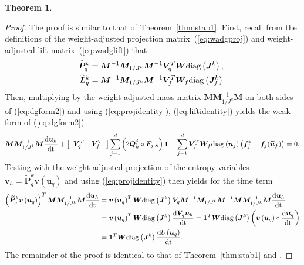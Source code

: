 \documentclass[preprint,10pt]{article}
\theoremstyle{definition}
\theoremstyle{lemma}
\theoremstyle{theorem}
\newtheorem{theorem}{Theorem}
\theoremstyle{assumption}
\renewcommand{\tilde}{\widetilde}
\newcommand{\td}[2]{\frac{{\rm d}#1}{{\rm d}{\rm #2}}}
\newcommand{\LRp}[1]{\left( #1 \right)}
\newcommand{\LRs}[1]{\left[ #1 \right]}
\newcommand{\diag}[1]{{\rm diag}\LRp{#1}}
\begin{document}
{\begin{theorem}
\[\]
\label{thm:stab2}
\end{theorem}
\begin{proof}
The proof is similar to that of Theorem~\ref{thm:stab1}.  
First, recall from the definitions of the weight-adjusted projection matrix~(\ref{eq:wadgproj}) and weight-adjusted lift matrix~(\ref{eq:wadglift}) that
\begin{align}
\tilde{\bm{P}}^k_q &= \bm{M}^{-1}\bm{M}_{1/J^k} \bm{M}^{-1} \bm{V}_q^T \bm{W}  \diag{\bm{J}^k  }\label{eq:projidentity},\\
\tilde{\bm{L}}^k_q &= \bm{M}^{-1}\bm{M}_{1/J^k} \bm{M}^{-1} \bm{V}_f^T \bm{W}_f\diag{\bm{J}^k_f}\label{eq:liftidentity}.
\end{align}
Then, multiplying by the weight-adjusted mass matrix $\bm{M}\bm{M}_{1/J^k}^{-1}\bm{M}$ on both sides of (\ref{eq:dgform2}) and using (\ref{eq:projidentity}), (\ref{eq:liftidentity}) yields the weak form of (\ref{eq:dgform2})
\begin{equation}
\bm{M}\bm{M}_{1/J^k}^{-1}\bm{M}\td{\bm{u}_h}{t} + \LRs{\begin{array}{cc}{\bm{V}}_q^T & {\bm{V}}_f^T\end{array}}
\sum_{j=1}^d \LRp{2\bm{Q}^j_k \circ \bm{F}_{j,S}}\bm{1} + \sum_{j=1}^d {\bm{V}}_f^T\bm{W}_f \diag{\bm{n}_j}\LRp{\bm{f}_j^* - \bm{f}_j(\tilde{\bm{u}}_f)} = 0.
\label{eq:dgform2weak}
\end{equation}
Testing with the weight-adjusted projection of the entropy variables $\bm{v}_h = \tilde{\bm{P}}^k_q \bm{v}\LRp{\bm{u}_q}$ and using (\ref{eq:projidentity}) then yields for the time term
\begin{align*}
\LRp{\tilde{\bm{P}}^k_q \bm{v}\LRp{\bm{u}_q}}^T\bm{M}\bm{M}_{1/J^k}^{-1}\bm{M}\td{\bm{u}_h}{t} &= \bm{v}\LRp{\bm{u}_q}^T\bm{W}\diag{\bm{J}^k}\bm{V}_q \bm{M}^{-1}\bm{M}_{1/J^k} \bm{M}^{-1} \bm{M}\bm{M}_{1/J^k}^{-1}\bm{M}\td{\bm{u}_h}{t}\\
                                                                                               &= \bm{v}\LRp{\bm{u}_q}^T\bm{W}\diag{\bm{J}^k} \td{\bm{V}_q\bm{u}_h}{t} = \bm{1}^T\bm{W}\diag{\bm{J}^k} \left(\bm{v}\LRp{\bm{u}_q}\circ\td{\bm{u}_q}{t}\right) \\
                                                                                               &= \bm{1}^T\bm{W}\diag{\bm{J}^k} \td{U(\bm{u}_q)}{t}.
\end{align*}
The remainder of the proof is identical to that of Theorem~\ref{thm:stab1} and \cite{chan2017discretely}.
\end{proof}

}
\end{document}
